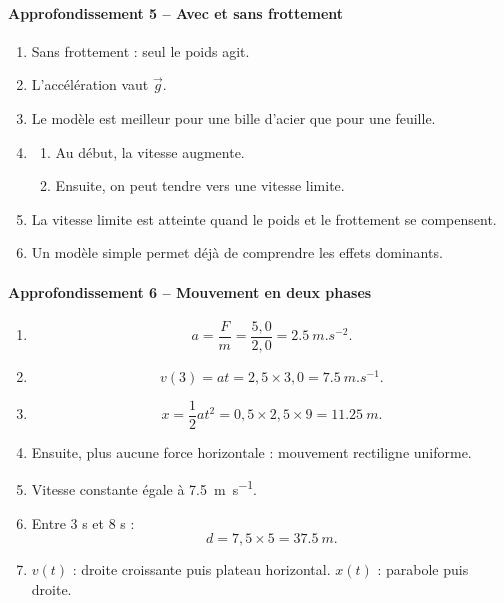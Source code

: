 \documentclass[11pt,a4paper]{article}
\theoremstyle{definition}
\begin{document}
\paragraph{Approfondissement 5 -- Avec et sans frottement}
\begin{enumerate}[label=\arabic*.]
    \item Sans frottement : seul le poids agit.
    \item L’accélération vaut $\vec g$.
    \item Le modèle est meilleur pour une bille d’acier que pour une feuille.
    \item
    \begin{enumerate}[label=\alph*)]
        \item Au début, la vitesse augmente.
        \item Ensuite, on peut tendre vers une vitesse limite.
    \end{enumerate}
    \item La vitesse limite est atteinte quand le poids et le frottement se compensent.
    \item Un modèle simple permet déjà de comprendre les effets dominants.
\end{enumerate}

\paragraph{Approfondissement 6 -- Mouvement en deux phases}
\begin{enumerate}[label=\arabic*.]
    \item
    \[
    a=\frac{F}{m}=\frac{5,0}{2,0}=\SI{2,5}{m.s^{-2}}.
    \]
    \item
    \[
    v(3)=at=2,5\times 3,0=\SI{7,5}{m.s^{-1}}.
    \]
    \item
    \[
    x=\frac12 at^2=0,5\times2,5\times9=\SI{11,25}{m}.
    \]
    \item Ensuite, plus aucune force horizontale : mouvement rectiligne uniforme.
    \item Vitesse constante égale à \SI{7,5}{m.s^{-1}}.
    \item Entre 3 s et 8 s :
    \[
    d=7,5\times5=\SI{37,5}{m}.
    \]
    \item $v(t)$ : droite croissante puis plateau horizontal. $x(t)$ : parabole puis droite.
\end{enumerate}
\end{document}
